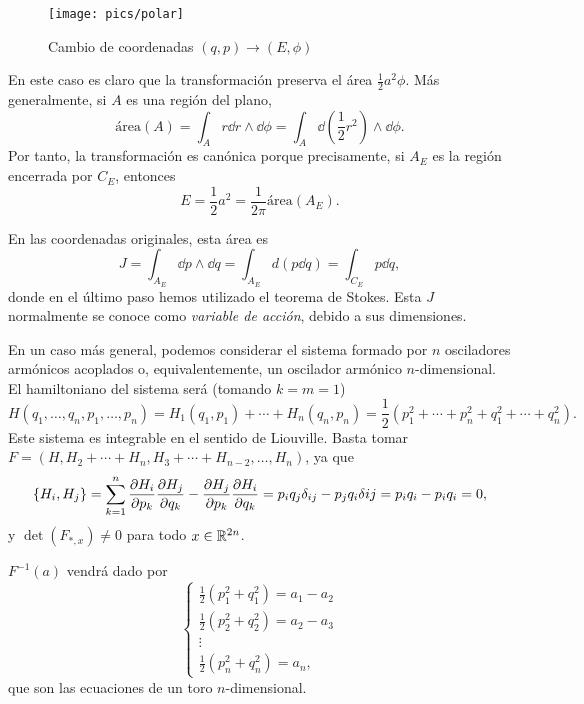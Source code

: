 \begin{ejemplo}
\begin{figure}[h]
    \centering
    \texttt{[image: pics/polar]}
    \caption{Cambio de coordenadas $(q,p) \rightarrow (E,\phi)$}
    \label{fig:polar}
  \end{figure}
  En este caso es claro que la transformación preserva el área $\frac{1}{2}a^2\phi$. Más generalmente, si $A$ es una región del plano, 
  \begin{equation*}
    \text{área}(A)= \int_A r \dd r \wedge \dd \phi = \int_A \dd\left(\frac{1}{2}r^2\right) \wedge \dd \phi.
  \end{equation*}
  Por tanto, la transformación es canónica porque precisamente, si $A_E$ es la región encerrada por $C_E$, entonces
  \begin{equation*}
    E=\frac{1}{2}a^2=\frac{1}{2\pi}\text{área}(A_E).
  \end{equation*}

  En las coordenadas originales, esta área es
  \begin{equation*}
    J=\int_{A_E} \dd p \wedge \dd q = \int_{A_E}d (p\dd q) = \int_{C_E} p \dd q,
  \end{equation*}
  donde en el último paso hemos utilizado el teorema de Stokes. Esta $J$ normalmente se conoce como \emph{variable de acción}, debido a sus dimensiones.

  En un caso más general, podemos considerar el sistema formado por $n$ osciladores armónicos acoplados o, equivalentemente, un oscilador armónico $n$-dimensional. El hamiltoniano del sistema será (tomando $k=m=1$)
  \begin{equation*}
    H(q_1,\dots,q_n,p_1,\dots,p_n)= H_1(q_1,p_1)+ \cdots +H_n(q_n,p_n) = \frac{1}{2}(p_1^2+\cdots+p_n^2+q_1^2+\cdots+q_n^2).
  \end{equation*}
  Este sistema es integrable en el sentido de Liouville. Basta tomar $F=(H,H_2+\cdots+H_{n},H_3+\cdots+H_{n-2},\dots,H_n)$, ya que 
  \begin{equation*}
    \left\lbrace H_i,H_j\right\rbrace = \sum_{k=1}^n \frac{\partial H_i}{\partial p_k}\frac{\partial H_j}{\partial q_k} - \frac{\partial H_j}{\partial p_k}\frac{\partial H_i}{\partial q_k}= p_iq_j \delta_{ij} - p_jq_i \delta{ij} = p_iq_i-p_iq_i = 0,
  \end{equation*}
  y $\det(F_{*,x}) \neq 0$ para todo $x \in \mathbb{R}^{2n}$. 
  
  $F^{-1}(a)$ vendrá dado por 
  \begin{equation*}
    \left\lbrace
    \begin{array}{l}
      \frac{1}{2}(p_1^2+q_1^2)=a_1-a_2 \\
      \frac{1}{2}(p_2^2+q_2^2)=a_2-a_3 \\
\vdots \\
\frac{1}{2}(p_n^2+q_n^2)=a_n, 
    \end{array}
    \right.
  \end{equation*}
  que son las ecuaciones de un toro $n$-dimensional.


\end{ejemplo}
